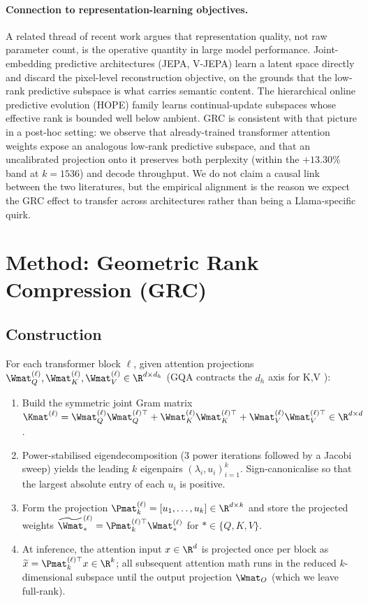 \documentclass[11pt]{article}
\begin{document}
\paragraph{Connection to representation-learning objectives.}
A related thread of recent work argues that representation quality, not
raw parameter count, is the operative quantity in large model performance.
Joint-embedding predictive architectures (JEPA, V-JEPA)
\cite{assran2023ijepa,bardes2024vjepa} learn a latent space directly and
discard the pixel-level reconstruction objective, on the grounds that the
low-rank predictive subspace is what carries semantic content. The
hierarchical online predictive evolution (HOPE) family
\cite{behrouz2025hope} learns continual-update subspaces whose effective
rank is bounded well below ambient. GRC is consistent with that picture in
a post-hoc setting: we observe that already-trained transformer attention
weights expose an analogous low-rank predictive subspace, and that an
uncalibrated projection onto it preserves both perplexity (within the
$+13.30\%$ band at $k{=}1536$) and decode throughput. We do not claim a
causal link between the two literatures, but the empirical alignment is the
reason we expect the GRC effect to transfer across architectures rather
than being a Llama-specific quirk.

\section{Method: Geometric Rank Compression (GRC)}
\label{sec:method}

\subsection{Construction}
For each transformer block $\ell$, given attention projections
$\Wmat_Q^{(\ell)},\Wmat_K^{(\ell)},\Wmat_V^{(\ell)}\in\R^{d\times d_h}$
(GQA contracts the $d_h$ axis for K,V \cite{ainslie2023gqa}):
\begin{enumerate}
\item Build the symmetric joint Gram matrix
$\Kmat^{(\ell)} = \Wmat_Q^{(\ell)}\Wmat_Q^{(\ell)\top}+\Wmat_K^{(\ell)}\Wmat_K^{(\ell)\top}+\Wmat_V^{(\ell)}\Wmat_V^{(\ell)\top}\in\R^{d\times d}$.
\item Power-stabilised eigendecomposition (3 power iterations followed by a
Jacobi sweep) yields the leading $k$ eigenpairs
$(\lambda_i,u_i)_{i=1}^k$.  Sign-canonicalise so that the largest
absolute entry of each $u_i$ is positive.
\item Form the projection $\Pmat_k^{(\ell)}=[u_1,\dots,u_k]
\in\R^{d\times k}$ and store the projected weights
$\widetilde{\Wmat}_*^{(\ell)} = \Pmat_k^{(\ell)\top}\Wmat_*^{(\ell)}$ for
$*\in\{Q,K,V\}$.
\item At inference, the attention input $x\in\R^d$ is projected once
per block as $\widetilde{x} = \Pmat_k^{(\ell)\top}x\in\R^k$;
all subsequent attention math runs in the reduced $k$-dimensional subspace
until the output projection $\Wmat_O$ (which we leave full-rank).
\end{enumerate}
\end{document}
